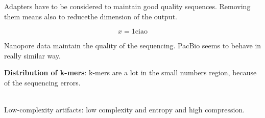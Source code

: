 Adapters have to be considered to maintain good quality sequences. Removing them means also to reducethe dimension of the output. 

$$ x = 1 \text{ciao}$$


Nanopore data maintain the quality of the sequencing.
PacBio seems to behave in really similar way. 


\textbf{Distribution of k-mers}: k-mers are a lot in the small numbers region, because of the sequencing errors. 

\\

Low-complexity artifacts: low complexity and entropy and high compression. 





